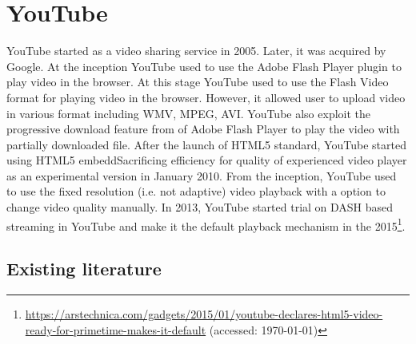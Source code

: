 \section{YouTube}
YouTube started as a video sharing service in 2005. Later, it was acquired by Google. At the inception YouTube used to use the Adobe Flash Player plugin to play video in the browser. At this stage YouTube used to use the Flash Video format for playing video in the browser. However, it allowed user to upload video in various format including WMV, MPEG, AVI. YouTube also exploit the progressive download feature from of Adobe Flash Player to play the video with partially downloaded file\cite{gill2007youtube}. After the launch of HTML5 standard, YouTube started using HTML5 embeddSacrificing efficiency for quality of experienced video player as an experimental version in January 2010. From the inception, YouTube used to use the fixed resolution (i.e. not adaptive) video playback with a option to change video quality manually.
In 2013, YouTube started trial on DASH based streaming in YouTube and make it the default playback mechanism in the 2015\footnote{\url{https://arstechnica.com/gadgets/2015/01/youtube-declares-html5-video-ready-for-primetime-makes-it-default} (accessed: \today)}.

\subsection{Existing literature}
\label{chap02:youtube:lit}
